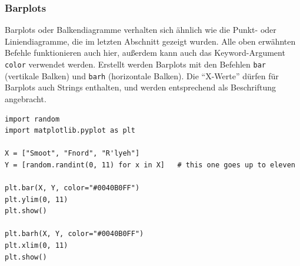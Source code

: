 \subsubsection{Barplots}
Barplots oder Balkendiagramme verhalten sich ähnlich wie die Punkt- oder Liniendiagramme, die im letzten Abschnitt gezeigt wurden. Alle oben erwähnten Befehle funktionieren auch hier, außerdem kann auch das Keyword-Argument \texttt{color} verwendet werden. Erstellt werden Barplots mit den Befehlen \texttt{bar} (vertikale Balken) und \texttt{barh} (horizontale Balken). Die \enquote{X-Werte} dürfen für Barplots auch Strings enthalten, und werden entsprechend als Beschriftung angebracht.

\begin{codebox}
\begin{verbatim}
import random
import matplotlib.pyplot as plt

X = ["Smoot", "Fnord", "R'lyeh"]
Y = [random.randint(0, 11) for x in X]   # this one goes up to eleven

plt.bar(X, Y, color="#0040B0FF")
plt.ylim(0, 11)
plt.show()

plt.barh(X, Y, color="#0040B0FF")
plt.xlim(0, 11)
plt.show()
\end{verbatim}
\end{codebox}
%
